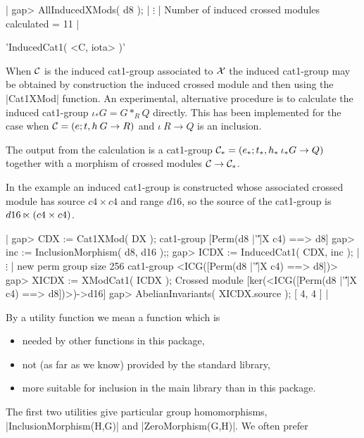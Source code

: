 |    gap> AllInducedXMods( d8 );
           | $\vdots$ |
    Number of induced crossed modules calculated = 11  |

%

'InducedCat1( <C, iota> )'

When ${\cal C}$ is the induced cat1-group associated to ${\cal X}$ the
induced cat1-group may be obtained by construction the induced crossed
module   and then using  the  |Cat1XMod|  function.   An experimental,
alternative  procedure   is  to  calculate    the induced   cat1-group
$\iota_\ast G = G  \ast_R Q$ directly.  This  has been implemented for
the case when ${\cal C} = ( e;t,h \: G \to R)$ and $\iota  \: R \to Q$
is an inclusion.

The output  from the  calculation is a   cat1-group  ${\cal C}_\ast  =
(e_\ast;t_\ast,   h_\ast \: \iota_{\ast}G    \to Q)$  together  with a
morphism of crossed modules ${\cal C} \to {\cal C}_{\ast}$.

In  the example an induced  cat1-group is constructed whose associated
crossed module has  source  $c4 \times  c4$  and range $d16$,  so  the
source of the cat1-group is $d16 \semidirect (c4 \times c4)$.

|    gap> CDX := Cat1XMod( DX );
    cat1-group [Perm(d8 |'\|'|X c4) ==> d8] 
    gap> inc := InclusionMorphism( d8, d16 );;
    gap> ICDX := InducedCat1( CDX, inc );
          | $\vdots$ |
    new perm group size 256
    cat1-group <ICG([Perm(d8 |'\|'|X c4) ==> d8])> 
    gap> XICDX := XModCat1( ICDX );
    Crossed module [ker(<ICG([Perm(d8 |'\|'|X c4) ==> d8])>)->d16]
    gap> AbelianInvariants( XICDX.source );
    [ 4, 4 ]  |

\newpage



By a utility function we mean a {\GAP} function which is\:
\begin{itemize}
\item needed by other functions in this package,
\item not (as far as we know) provided by the standard {\GAP} library,
\item more suitable for inclusion in the main library than in this package.
\end{itemize}

The  first   two   utilities   give  particular  group  homomorphisms,
|InclusionMorphism(H,G)| and |ZeroMorphism(G,H)|.  We often prefer

